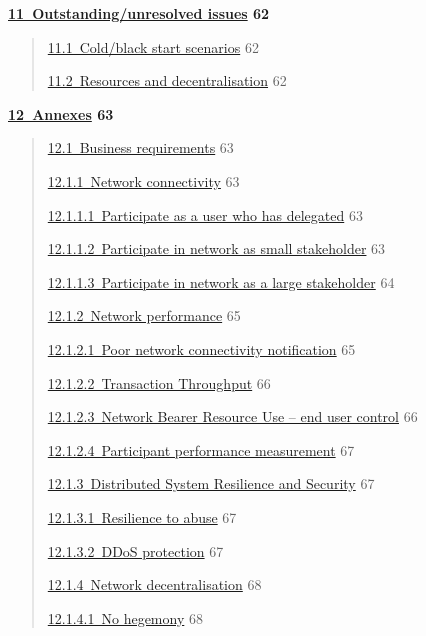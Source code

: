 \documentclass[]{article}
\begin{document}
\textbf{\protect\hyperlink{outstandingunresolved-issues}{​11​~Outstanding/unresolved
issues} 62}

\begin{quote}
\protect\hyperlink{coldblack-start-scenarios}{​11.1​~Cold/black start
scenarios} 62

\protect\hyperlink{resources-and-decentralisation}{​11.2​~Resources and
decentralisation} 62
\end{quote}

\textbf{\protect\hyperlink{annexes}{​12​~Annexes} 63}

\begin{quote}
\protect\hyperlink{business-requirements}{​12.1​~Business requirements}
63

\protect\hyperlink{network-connectivity}{​12.1.1​~Network connectivity}
63

\protect\hyperlink{participate-as-a-user-who-has-delegated}{​12.1.1.1​~Participate
as a user who has delegated} 63

\protect\hyperlink{participate-in-network-as-small-stakeholder}{​12.1.1.2​~Participate
in network as small stakeholder} 63

\protect\hyperlink{participate-in-network-as-a-large-stakeholder}{​12.1.1.3​~Participate
in network as a large stakeholder} 64

\protect\hyperlink{network-performance}{​12.1.2​~Network performance} 65

\protect\hyperlink{poor-network-connectivity-notification}{​12.1.2.1​~Poor
network connectivity notification} 65

\protect\hyperlink{transaction-throughput}{​12.1.2.2​~Transaction
Throughput} 66

\protect\hyperlink{network-bearer-resource-use-end-user-control}{​12.1.2.3​~Network
Bearer Resource Use -- end user control} 66

\protect\hyperlink{participant-performance-measurement}{​12.1.2.4​~Participant
performance measurement} 67

\protect\hyperlink{distributed-system-resilience-and-security}{​12.1.3​~Distributed
System Resilience and Security} 67

\protect\hyperlink{resilience-to-abuse}{​12.1.3.1​~Resilience to abuse}
67

\protect\hyperlink{ddos-protection}{​12.1.3.2​~DDoS protection} 67

\protect\hyperlink{network-decentralisation}{​12.1.4​~Network
decentralisation} 68

\protect\hyperlink{no-hegemony}{​12.1.4.1​~No hegemony} 68


\end{quote}
\end{document}
